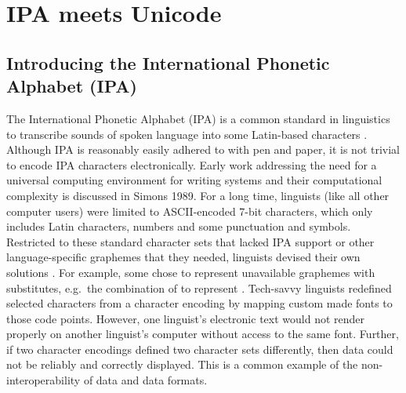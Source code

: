 \chapter{IPA meets Unicode}
\label{ipa-meets-unicode}

\section{Introducing the International Phonetic Alphabet (IPA)}
\label{introducing-the-international-phonetic-alphabet-ipa}

The International Phonetic Alphabet (IPA) is a common standard in linguistics to transcribe sounds of spoken language into some Latin-based characters \citep{IPA2005}. Although IPA is reasonably easily adhered to with pen and paper, it is not trivial to encode IPA characters electronically. Early work addressing the need for a universal computing environment for writing systems and their computational complexity is discussed in Simons 1989. For a long time, linguists (like all other computer users) were limited to ASCII-encoded 7-bit characters, which only includes Latin characters, numbers and some punctuation and symbols. Restricted to these standard character sets that lacked IPA support or other language-specific graphemes that they needed, linguists devised their own solutions \citep{BirdSimons2003}. For example, some chose to represent unavailable graphemes with substitutes, e.g.~the combination of to represent . Tech-savvy linguists redefined selected characters from a character encoding by mapping custom made fonts to those code points. However, one linguist's electronic text would not render properly on another linguist's computer without access to the same font. Further, if two character encodings defined two character sets differently, then data could not be reliably and correctly displayed. This is a common example of the non-interoperability of data and data formats.

